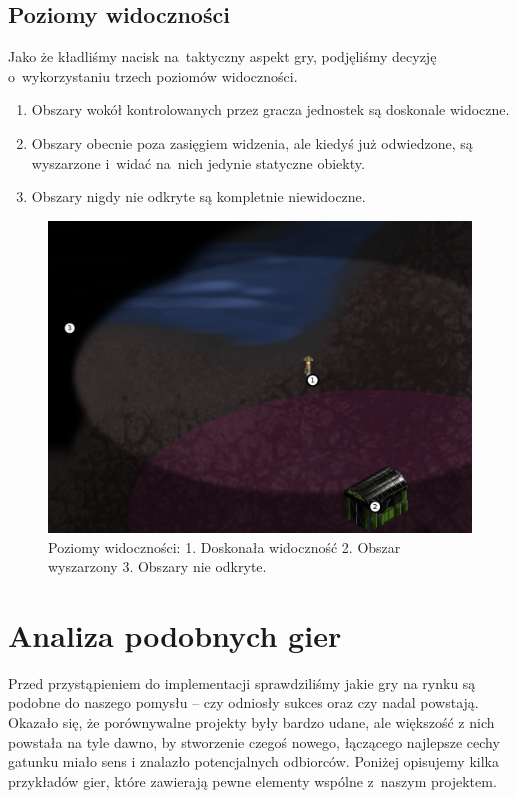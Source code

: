 \documentclass[licencjacka]{pracamgr}
\begin{document}
    \subsection{Poziomy widoczności}
      Jako że kładliśmy nacisk na~taktyczny aspekt gry, podjęliśmy decyzję o~wykorzystaniu trzech poziomów widoczności. 
      \begin{enumerate}
        \item Obszary wokół kontrolowanych przez gracza jednostek są doskonale widoczne.
        \item Obszary obecnie poza zasięgiem widzenia, ale kiedyś już odwiedzone, są wyszarzone i~widać na~nich jedynie
        statyczne obiekty.
        \item Obszary nigdy nie odkryte są kompletnie niewidoczne.
      \end{enumerate}

      \begin{figure}[h]
        \centering
        \includegraphics[scale=0.3]{fow.png}
        \caption{Poziomy widoczności: 1. Doskonała widoczność 2. Obszar wyszarzony 3. Obszary nie odkryte.}
      \end{figure}

  \section{Analiza podobnych gier}
    Przed przystąpieniem do implementacji sprawdziliśmy jakie gry na rynku są podobne do naszego pomysłu -- czy odniosły
    sukces oraz czy nadal powstają. Okazało się, że porównywalne projekty były bardzo udane, ale większość z nich powstała
    na tyle dawno, by stworzenie czegoś nowego, łączącego najlepsze cechy gatunku miało sens i znalazło potencjalnych
    odbiorców. Poniżej opisujemy kilka przykładów gier, które zawierają pewne elementy wspólne z~naszym projektem.
\end{document}
